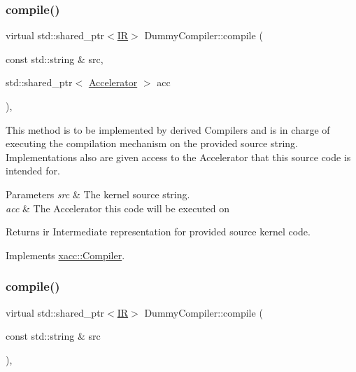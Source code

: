 \subsubsection{\texorpdfstring{compile()}{compile()}\hspace{0.1cm}{\footnotesize\ttfamily [1/2]}}
{\footnotesize\ttfamily virtual std\+::shared\+\_\+ptr$<$\hyperlink{a01499}{IR}$>$ Dummy\+Compiler\+::compile (\begin{DoxyParamCaption}\item[{const std\+::string \&}]{src,  }\item[{std\+::shared\+\_\+ptr$<$ \hyperlink{a01435}{Accelerator} $>$}]{acc }\end{DoxyParamCaption})\hspace{0.3cm}{\ttfamily [inline]}, {\ttfamily [virtual]}}

This method is to be implemented by derived Compilers and is in charge of executing the compilation mechanism on the provided source string. Implementations also are given access to the Accelerator that this source code is intended for.


\begin{DoxyParams}{Parameters}
{\em src} & The kernel source string. \\
\hline
{\em acc} & The Accelerator this code will be executed on \\
\hline
\end{DoxyParams}
\begin{DoxyReturn}{Returns}
ir Intermediate representation for provided source kernel code. 
\end{DoxyReturn}


Implements \hyperlink{a01451_a546a40c95bb93af6a0c0ac48dbeaffc8}{xacc\+::\+Compiler}.

\mbox{\label{a01139_a2f9bb3d30bb11f12b530854a11c8fb25}} 
\subsubsection{\texorpdfstring{compile()}{compile()}\hspace{0.1cm}{\footnotesize\ttfamily [2/2]}}
{\footnotesize\ttfamily virtual std\+::shared\+\_\+ptr$<$\hyperlink{a01499}{IR}$>$ Dummy\+Compiler\+::compile (\begin{DoxyParamCaption}\item[{const std\+::string \&}]{src }\end{DoxyParamCaption})\hspace{0.3cm}{\ttfamily [inline]}, {\ttfamily [virtual]}}


